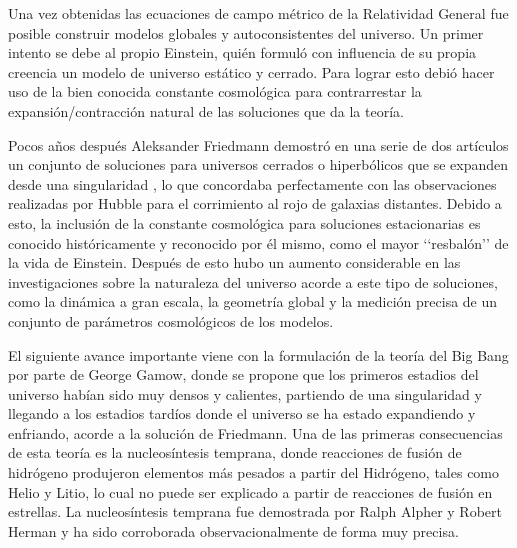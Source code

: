 Una vez obtenidas las ecuaciones de campo métrico de la Relatividad General
fue posible construir modelos globales y autoconsistentes del universo. Un
primer intento se debe al propio Einstein, quién formuló con influencia 
de su propia creencia un modelo de universo estático y cerrado. Para lograr 
esto debió hacer uso de la bien conocida constante cosmológica para 
contrarrestar la expansión/contracción natural de las soluciones que da
la teoría.


Pocos años después Aleksander Friedmann demostró en una serie de dos 
artículos un conjunto de soluciones para universos cerrados o hiperbólicos
que se expanden desde una singularidad \cite{FriedmanA} \cite{FriedmanB}, 
lo que concordaba perfectamente con las observaciones realizadas por Hubble 
para el corrimiento al rojo de galaxias distantes. Debido a esto, la 
inclusión de la constante cosmológica para soluciones estacionarias es 
conocido históricamente y reconocido por él mismo, como el mayor ‘‘resbalón’’ 
de la vida de Einstein. Después de esto hubo un aumento considerable en las 
investigaciones sobre la naturaleza del universo acorde a este tipo de 
soluciones, como la dinámica a gran escala, la geometría global y la 
medición precisa de un conjunto de parámetros cosmológicos de los modelos.


El siguiente avance importante viene con la formulación de la teoría del 
Big Bang por parte de George Gamow, donde se propone que los primeros
estadios del universo habían sido muy densos y calientes, partiendo de una
singularidad y llegando a los estadios tardíos donde el universo se ha 
estado expandiendo y enfriando, acorde a la solución de Friedmann. Una
de las primeras consecuencias de esta teoría es la nucleosíntesis temprana,
donde reacciones de fusión de hidrógeno produjeron elementos más pesados 
a partir del Hidrógeno, tales como Helio y Litio, lo cual no puede ser 
explicado a partir de reacciones de fusión en estrellas. La nucleosíntesis
temprana fue demostrada por Ralph Alpher y Robert Herman y ha sido 
corroborada observacionalmente de forma muy precisa.

